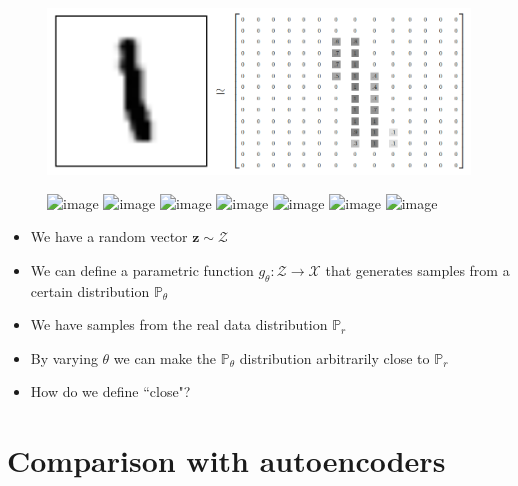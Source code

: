 \documentclass{Bredelebeamer}
\begin{document}
\begin{frame}
\begin{figure}[h!]
	\centering
	\includegraphics[width=\textwidth]{mnist_pixel_space.png}
\end{figure}

\end{frame}

\begin{frame}
\begin{figure}[h!]
	\centering
	\includegraphics<1>[width=\textwidth]{distr/1.png}
	\includegraphics<2>[width=\textwidth]{distr/2.png}
	\includegraphics<3>[width=\textwidth]{distr/3.png}
	\includegraphics<4>[width=\textwidth]{distr/4.png}
	\includegraphics<5>[width=\textwidth]{distr/5.png}
	\includegraphics<6>[width=\textwidth]{distr/6.png}
	\includegraphics<7->[width=\textwidth]{distr/7.png}
\end{figure}
\begin{itemize}[<+(7)->]
	\item We have a random vector $ \bm{z} \sim \mathcal{Z}$
		\item We can define a parametric function $g_\theta: \mathcal{Z} \rightarrow \mathcal{X}$ that generates samples from a certain distribution $\mathbb{P}_\theta$
		\item We have samples from the real data distribution $\mathbb{P}_\textit{r}$
		\item By varying $\theta$ we can make the $\mathbb{P}_\theta$ distribution arbitrarily close to $\mathbb{P}_\textit{r}$
		\item How do we define ``close"?
\end{itemize}
\end{frame} 


\section{Comparison with autoencoders}
\end{document}
